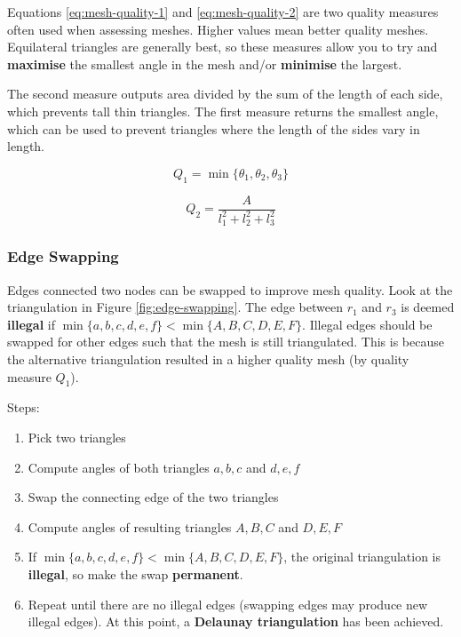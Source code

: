 \documentclass{article}
\begin{document}
Equations \ref{eq:mesh-quality-1} and \ref{eq:mesh-quality-2} are two quality measures often used when assessing meshes. Higher values mean better quality meshes. Equilateral triangles are generally best, so these measures allow you to try and \textbf{maximise} the smallest angle in the mesh and/or \textbf{minimise} the largest.

The second measure outputs area divided by the sum of the length of each side, which prevents tall thin triangles. The first measure returns the smallest angle, which can be used to prevent triangles where the length of the sides vary in length.

\begin{equation}
	Q_1 = \min \lbrace \theta_1, \theta_2, \theta_3 \rbrace
	\label{eq:mesh-quality-1}
\end{equation}

\begin{equation}
	Q_2 = \frac{A}{l_1^2 + l_2^2 + l_3^2}
	\label{eq:mesh-quality-2}
\end{equation}

\subsubsection{Edge Swapping}

Edges connected two nodes can be swapped to improve mesh quality. Look at the triangulation in Figure \ref{fig:edge-swapping}. The edge between $r_1$ and $r_3$ is deemed \textbf{illegal} if $\min \lbrace a, b, c, d, e, f \rbrace < \min \lbrace A, B, C, D, E,F \rbrace$.  Illegal edges should be swapped for other edges such that the mesh is still triangulated. This is because the alternative triangulation resulted in a higher quality mesh (by quality measure $Q_1$).

Steps:
\begin{enumerate}
	\item Pick two triangles
	\item Compute angles of both triangles $a, b, c$ and $d, e, f$
	\item Swap the connecting edge of the two triangles
	\item Compute angles of resulting triangles $A, B, C$ and $D, E, F$
	\item If $\min \lbrace a, b, c, d, e, f \rbrace < \min \lbrace A, B, C, D, E,F \rbrace$, the original triangulation is \textbf{illegal}, so make the swap \textbf{permanent}.
	\item Repeat until there are no illegal edges (swapping edges may produce new illegal edges). At this point, a \textbf{Delaunay triangulation} has been achieved.
\end{enumerate}
\end{document}
